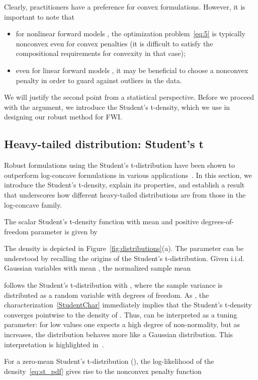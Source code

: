 \documentclass[nospthms]{svjour3}
\numberwithin{equation}{section}
\begin{document}
Clearly, practitioners have a preference for convex formulations.
However, it is important to note that
\begin{itemize}
\item for nonlinear forward models , the optimization
  problem~\eqref{eq:5} is typically nonconvex even for convex
  penalties  (it is difficult to satisfy the compositional
  requirements for convexity in that case);
\item even for linear forward models , it may be beneficial to
  choose a nonconvex penalty in order to guard against
  outliers in the data.
\end{itemize}
We will justify the second point from a statistical
perspective. Before we proceed with the argument, we introduce the
Student's t-density, which we use in designing our robust method for
FWI.






\subsection{Heavy-tailed distribution: Student's t}
Robust formulations using the Student's t-distribution have been shown
to outperform log-concave formulations in various
applications~\cite{AravkinThesis2010}.  In this section, we introduce
the Student's t-density, explain its properties, and establish a
result that underscores how different heavy-tailed distributions are
from those in the log-concave family.

The scalar Student's t-density function with mean  and
positive degrees-of-freedom parameter  is given by

The density is depicted in Figure~\ref{fig:distributions}(a).
The parameter  can be understood by recalling the origins of the
Student's t-distribution.  Given  i.i.d. Gaussian variables 
with mean , the normalized sample mean

follows the Student's t-distribution with , where the
sample variance  is
distributed as a  random variable with  degrees of
freedom.  As , the
characterization~\eqref{StudentChar} immediately implies that the
Student's t-density converges pointwise to the density of
. Thus,  can be interpreted as a tuning parameter: for
low values one expects a high degree of non-normality, but as 
increases, the distribution behaves more like a Gaussian
distribution. This interpretation is highlighted
in~\cite{Lange1989}. 

For a zero-mean Student's t-distribution (), the log-likelihood
of the density~\eqref{eq:st_pdf} gives rise to the nonconvex penalty
function
\end{document}
